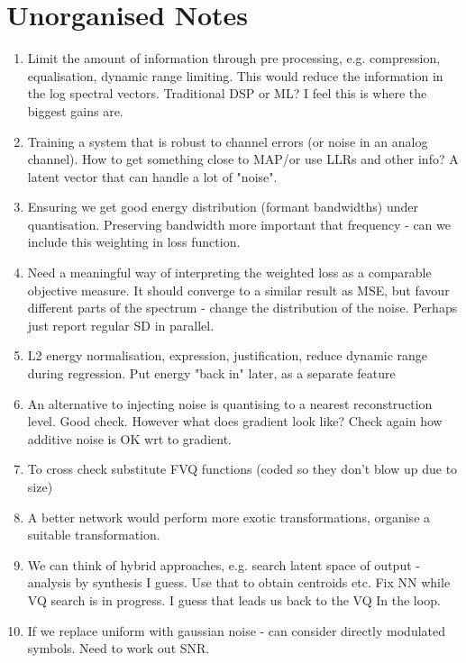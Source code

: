 \documentclass{article}
\begin{document}
\section {Unorganised Notes}

\begin{enumerate}
\item Limit the amount of information through pre processing, e.g. compression, equalisation, dynamic range limiting.  This would reduce the information in the log spectral vectors.  Traditional DSP or ML? I feel this is where the biggest gains are.
\item Training a system that is robust to channel errors (or noise in an analog channel). How to get something close to MAP/or use LLRs and other info?  A latent vector that can handle a lot of "noise".
\item Ensuring we get good energy distribution (formant bandwidths) under quantisation.  Preserving bandwidth more important that frequency - can we include this weighting in loss function.
\item Need a meaningful way of interpreting the weighted loss as a comparable objective measure.  It should converge to a similar result as MSE, but favour different parts of the spectrum - change the distribution of the noise. Perhaps just report regular SD in parallel.
\item L2 energy normalisation, expression, justification, reduce dynamic range during regression. Put energy "back in" later, as a separate feature
\item An alternative to injecting noise is quantising to a nearest reconstruction level.  Good check.  However what does gradient look like?  Check again how additive noise is OK wrt to gradient. 
\item To cross check substitute FVQ functions (coded so they don't blow up due to size)
\item A better network would perform more exotic transformations, organise a suitable transformation.
\item We can think of hybrid approaches, e.g. search latent space of output - analysis by synthesis I guess.  Use that to obtain centroids etc.  Fix NN while VQ search is in progress.  I guess that leads us back to the VQ In the loop.
\item If we replace uniform with gaussian noise - can consider directly modulated symbols.  Need to work out SNR.
\end{enumerate}



\end{document}
